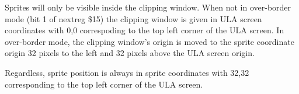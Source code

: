 Sprites will only be visible inside the clipping window. When not in
over-border mode (bit 1 of nextreg \$15) the clipping window is given
in ULA screen coordinates with 0,0 correspoding to the top left corner
of the ULA screen. In over-border mode, the clipping window’s origin
is moved to the sprite coordinate origin 32 pixels to the left and 32
pixels above the ULA screen origin.

Regardless, sprite position is always in sprite coordinates with 32,32
corresponding to the top left corner of the ULA screen.




